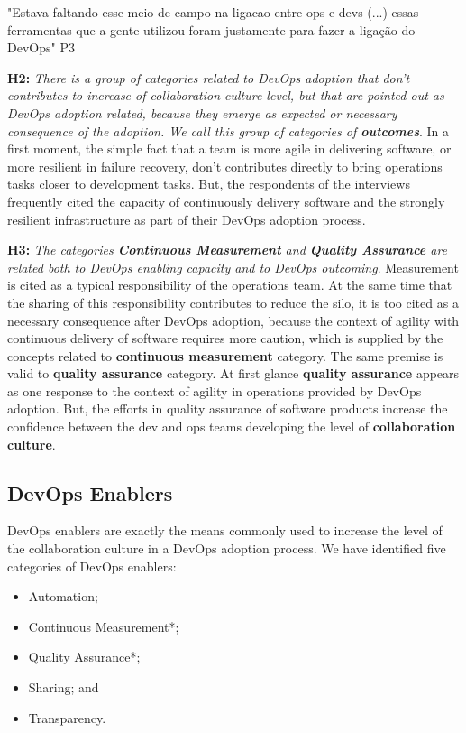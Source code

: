 "Estava faltando esse meio de campo na ligacao entre ops e devs (...) essas ferramentas que a gente utilizou foram justamente para fazer a ligação do DevOps" P3

\textbf{H2:} \textit{There is a group of categories related to DevOps adoption that don't contributes to increase of collaboration culture level, but that are pointed out as DevOps adoption related, because they emerge as expected or necessary consequence of the adoption. We call this group of categories of \textbf{outcomes}}. In a first moment, the simple fact that a team is more agile in delivering software, or more resilient in failure recovery, don't contributes directly to bring operations tasks closer to development tasks. But, the respondents of the interviews frequently cited the capacity of continuously delivery software and the strongly resilient infrastructure as part of their DevOps adoption process.

\textbf{H3:} \textit{The categories \textbf{Continuous Measurement} and \textbf{Quality Assurance} are related both to DevOps enabling capacity and to DevOps outcoming}. Measurement is cited as a typical responsibility of the operations team. At the same time that the sharing of this responsibility contributes to reduce the silo, it is too cited as a necessary consequence after DevOps adoption, because the context of agility with continuous delivery of software requires more caution, which is supplied by the concepts related to \textbf{continuous measurement} category. The same premise is valid to \textbf{quality assurance} category. At first glance \textbf{quality assurance} appears as one response to the context of agility in operations provided by DevOps adoption. But, the efforts in quality assurance of software products increase the confidence between the dev and ops teams developing the level of \textbf{collaboration culture}.

\subsection{DevOps Enablers}

DevOps enablers are exactly the means commonly used to increase the level of the collaboration culture in a DevOps adoption process. We have identified five categories of DevOps enablers:

\begin{itemize}
\item Automation;
\item Continuous Measurement*;
\item Quality Assurance*;
\item Sharing; and
\item Transparency.
\end{itemize}

